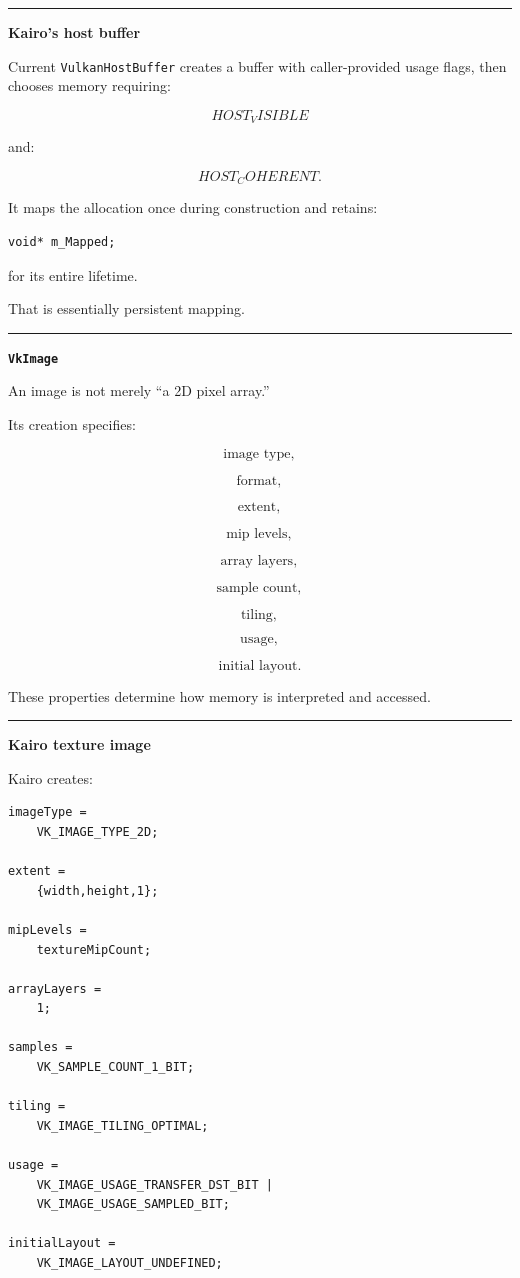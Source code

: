 \begin{center}\rule{0.5\linewidth}{0.5pt}\end{center}

\textbf{Kairo's host buffer}

Current \texttt{VulkanHostBuffer} creates a buffer with caller-provided usage flags, then chooses memory requiring:

\[
HOST_VISIBLE
\]

and:

\[
HOST_COHERENT.
\]

It maps the allocation once during construction and retains:

\begin{verbatim}
void* m_Mapped;
\end{verbatim}

for its entire lifetime.

That is essentially persistent mapping.

\begin{center}\rule{0.5\linewidth}{0.5pt}\end{center}

\textbf{\texttt{VkImage}}

An image is not merely ``a 2D pixel array.''

Its creation specifies:

\[
\text{image type},
\]

\[
\text{format},
\]

\[
\text{extent},
\]

\[
\text{mip levels},
\]

\[
\text{array layers},
\]

\[
\text{sample count},
\]

\[
\text{tiling},
\]

\[
\text{usage},
\]

\[
\text{initial layout}.
\]

These properties determine how memory is interpreted and accessed.

\begin{center}\rule{0.5\linewidth}{0.5pt}\end{center}

\textbf{Kairo texture image}

Kairo creates:

\begin{verbatim}
imageType =
    VK_IMAGE_TYPE_2D;

extent =
    {width,height,1};

mipLevels =
    textureMipCount;

arrayLayers =
    1;

samples =
    VK_SAMPLE_COUNT_1_BIT;

tiling =
    VK_IMAGE_TILING_OPTIMAL;

usage =
    VK_IMAGE_USAGE_TRANSFER_DST_BIT |
    VK_IMAGE_USAGE_SAMPLED_BIT;

initialLayout =
    VK_IMAGE_LAYOUT_UNDEFINED;
\end{verbatim}

